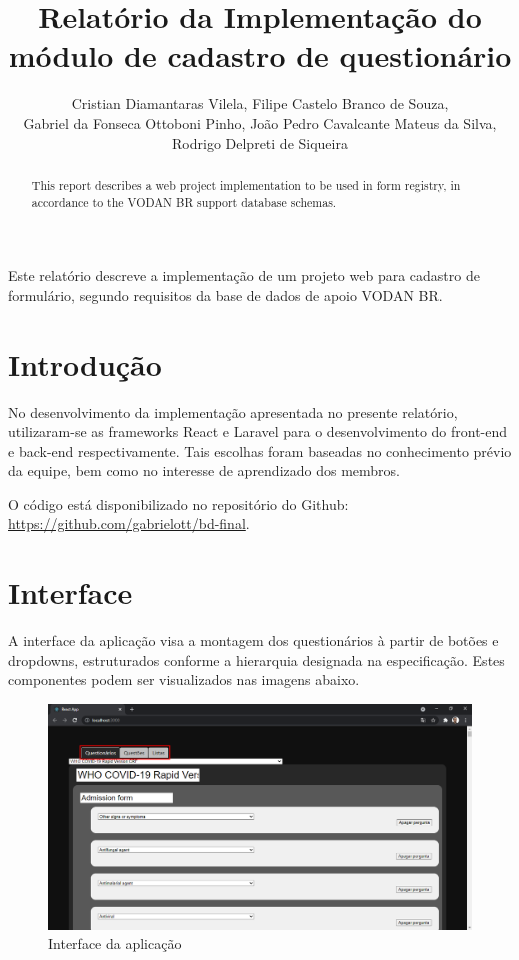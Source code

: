 \documentclass[12pt]{article}
\title{Relatório da Implementação do módulo
	de cadastro de questionário }
\author{
	Cristian Diamantaras Vilela\inst{1},
	Filipe Castelo Branco de Souza\inst{1},\\
	Gabriel da Fonseca Ottoboni Pinho\inst{1},
	João Pedro Cavalcante Mateus da Silva\inst{1},\\
	Rodrigo Delpreti de Siqueira\inst{1}
}
\begin{document}
 

\maketitle

\begin{abstract}
  This report describes a web project implementation
  to be used in form registry, in accordance to the
  VODAN BR support database schemas.
\end{abstract}
     
\begin{resumo} 
  Este relatório descreve a implementação
  de um projeto web
  para cadastro de formulário,
  segundo requisitos da base de dados
  de apoio VODAN BR.
\end{resumo}

\section{Introdução}

No desenvolvimento da implementação
apresentada no presente relatório,
utilizaram-se as frameworks React e Laravel
para o desenvolvimento do front-end e back-end
respectivamente.
Tais escolhas foram baseadas no conhecimento prévio
da equipe, bem como no interesse de aprendizado dos membros.

O código está disponibilizado no repositório do
Github: \url{https://github.com/gabrielott/bd-final}.

\section{Interface} \label{sec:firstpage}

A interface da aplicação visa a montagem
dos questionários à partir de botões e dropdowns,
estruturados conforme a hierarquia designada na especificação.
Estes componentes podem ser visualizados nas imagens abaixo.

\begin{figure}[ht]
	\centering
	\includegraphics[width=.5\textwidth]{front.png}
	\caption{Interface da aplicação}
	\label{fig:Figura1}
\end{figure}
\end{document}
